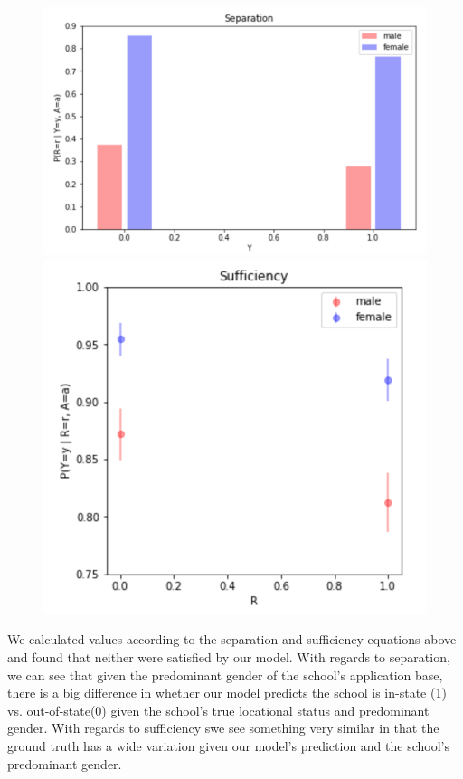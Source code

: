 \documentclass{article}
\begin{document}
\begin{figure}[H]%
    \centering
    {{\includegraphics[scale=0.4]{Separation.png} }}%
    {{\includegraphics[scale=0.4]{Sufficiency1.png}}}%
    \label{fig:example}%
\end{figure}

We calculated values according to the separation and sufficiency equations above and found that neither were satisfied by our model. With regards to separation, we can see that given the predominant gender of the school's application base, there is a big difference in whether our model predicts the school is in-state (1) vs. out-of-state(0) given the school's true locational status and predominant gender. With regards to sufficiency swe see something very similar in that the ground truth has a wide variation given our model's prediction and the school's predominant gender.
\end{document}
